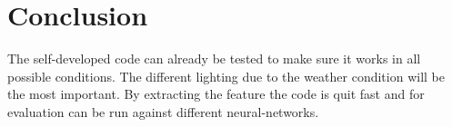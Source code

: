 \documentclass[10pt,a4paper]{article}
\begin{document}
	\section{Conclusion}
	The self-developed code can already be tested to make sure it works in all possible conditions. The different lighting due to the weather condition will be the most important.
	By extracting the feature the code is quit fast and for evaluation can be run against different neural-networks. 

	
\end{document}
